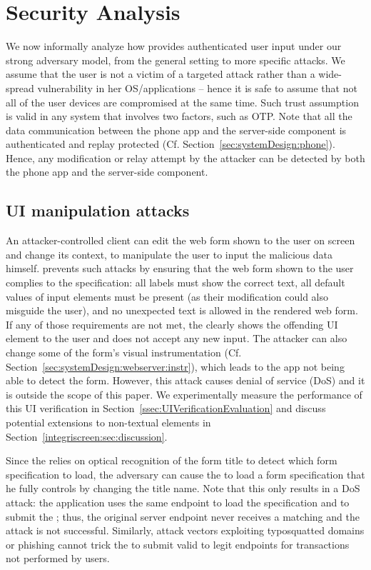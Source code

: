 \section{Security Analysis} 
\label{integriscreen:sec:securityAnalysis}


We now informally analyze how \sysname provides authenticated user input under our strong adversary model, from the general setting to more specific attacks.
We assume that the user is not a victim of a targeted attack rather than a wide-spread vulnerability in her OS/applications -- hence it is safe to assume that not all of the user devices are compromised at the same time. Such trust assumption is valid in any system that involves two factors, such as OTP. Note that all the data communication between the \sysname phone app and the server-side component is authenticated and replay protected (Cf. Section~\ref{sec:systemDesign:phone}). Hence, any modification or relay attempt by the attacker can be detected by both the phone app and the server-side component.


\subsection{UI manipulation attacks}

An attacker-controlled client can edit the web form shown to the user on screen and change its context, to manipulate the user to input the malicious data himself. \name prevents such attacks by ensuring that the web form shown to the user complies to the specification: all labels must show the correct text, all default values of input elements must be present (as their modification could also misguide the user), and no unexpected text is allowed in the rendered web form. If any of those requirements are not met, the \app clearly shows the offending UI element to the user and does not accept any new input. The attacker can also change some of the form's visual instrumentation (Cf. Section~\ref{sec:systemDesign:webserver:instr}), which leads to the \sysname app not being able to detect the form. However, this attack causes denial of service (DoS) and it is outside the scope of this paper.
We experimentally measure the performance of this UI verification in Section~\ref{ssec:UIVerificationEvaluation} and discuss potential extensions to non-textual elements in Section~\ref{integriscreen:sec:discussion}.


Since the \app relies on optical recognition of the form title to detect which form specification to load, the adversary can cause the \app to load a form specification that he fully controls by changing the title name.
Note that this only results in a DoS attack: the application uses the same endpoint to load the specification and to submit the \POI; thus, the original server endpoint never receives a matching \POI and the attack is not successful.
Similarly, attack vectors exploiting typosquatted domains or phishing cannot trick the \app to submit valid \PsOI to legit endpoints for transactions not performed by users.


